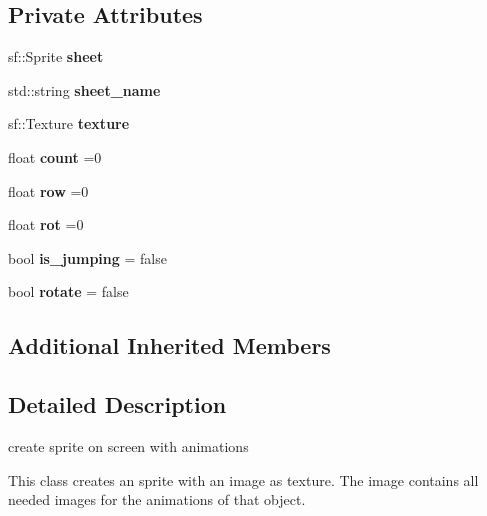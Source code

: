 \subsection*{Private Attributes}
\begin{DoxyCompactItemize}
\item 
\mbox{\label{classanimation_aa72ba079cfcb62b5dd7f6d74a9438516}} 
sf\+::\+Sprite {\bfseries sheet}
\item 
\mbox{\label{classanimation_a5406569ef9a8e47a8e50a927063613f6}} 
std\+::string {\bfseries sheet\+\_\+name}
\item 
\mbox{\label{classanimation_a9b49e5a7b856d127ea5481998c911fde}} 
sf\+::\+Texture {\bfseries texture}
\item 
\mbox{\label{classanimation_a50dde9518af0631ff1b86881a0e4c0ce}} 
float {\bfseries count} =0
\item 
\mbox{\label{classanimation_adaa2321a124fb03b2f4b3bd7af4e2127}} 
float {\bfseries row} =0
\item 
\mbox{\label{classanimation_a9a1d350886939f9e988d2786ca9709e7}} 
float {\bfseries rot} =0
\item 
\mbox{\label{classanimation_a8365683c0efa023b2bcb60b3fde9eeb2}} 
bool {\bfseries is\+\_\+jumping} = false
\item 
\mbox{\label{classanimation_a48077a46bbac0719c0a8227456620e14}} 
bool {\bfseries rotate} = false
\end{DoxyCompactItemize}
\subsection*{Additional Inherited Members}


\subsection{Detailed Description}
create sprite on screen with animations 

This class creates an sprite with an image as texture. The image contains all needed images for the animations of that object.


